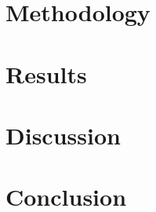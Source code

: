 \documentclass[conference]{IEEEtran}
\begin{document}
\section{Methodology}
%
%

\section{Results}
%
%

\section{Discussion}
%

\section{Conclusion}
%
\end{document}
